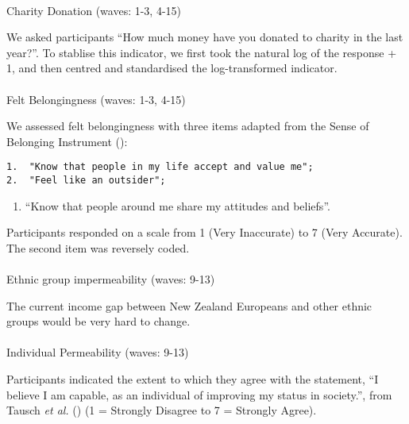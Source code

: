 \documentclass[
  singlecolumn,
  9pt]{article}
\makeatletter
\let\oldparagraph\paragraph
\renewcommand{\paragraph}{
    \@ifstar
      \xxxParagraphStar
      \xxxParagraphNoStar
  }
\newcommand{\xxxParagraphStar}[1]{\oldparagraph*{#1}\mbox{}}
\newcommand{\xxxParagraphNoStar}[1]{\oldparagraph{#1}\mbox{}}
\providecommand{\tightlist}{%
  \setlength{\itemsep}{0pt}\setlength{\parskip}{0pt}}\usepackage{longtable,booktabs,array}
\makeatother
\begin{document}
\paragraph{Charity Donation (waves: 1-3,
4-15)}\label{charity-donation-waves-1-3-4-15}

We asked participants ``How much money have you donated to charity in
the last year?''. To stablise this indicator, we first took the natural
log of the response + 1, and then centred and standardised the
log-transformed indicator.

\paragraph{Felt Belongingness (waves: 1-3,
4-15)}\label{felt-belongingness-waves-1-3-4-15}

We assessed felt belongingness with three items adapted from the Sense
of Belonging Instrument ():

\begin{verbatim}
1.  "Know that people in my life accept and value me";
2.  "Feel like an outsider";
\end{verbatim}

\begin{enumerate}
\def\labelenumi{\arabic{enumi}.}
\setcounter{enumi}{2}
\tightlist
\item
  ``Know that people around me share my attitudes and beliefs''.
\end{enumerate}

Participants responded on a scale from 1 (Very Inaccurate) to 7 (Very
Accurate). The second item was reversely coded.

\paragraph{Ethnic group impermeability (waves:
9-13)}\label{ethnic-group-impermeability-waves-9-13}

The current income gap between New Zealand Europeans and other ethnic
groups would be very hard to change.

\paragraph{Individual Permeability (waves:
9-13)}\label{individual-permeability-waves-9-13}

Participants indicated the extent to which they agree with the
statement, ``I believe I am capable, as an individual of improving my
status in society.'', from Tausch \emph{et al.}
() (1 = Strongly Disagree to 7 = Strongly
Agree).
\end{document}
